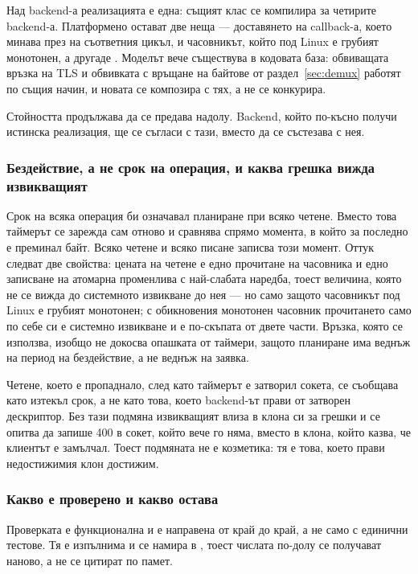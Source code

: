 Над backend-а реализацията е една: същият клас се компилира за четирите backend-а.
Платформено остават две неща — доставянето на callback-а, което минава през  на
съответния цикъл, и часовникът, който под Linux е грубият монотонен, а другаде
. Моделът вече
съществува в кодовата база: обвиващата връзка на TLS и обвивката с връщане на байтове от
раздел~\ref{sec:demux} работят по същия начин, и новата се композира с тях, а не се
конкурира.

Стойността продължава да се предава надолу. Backend, който по-късно получи истинска
реализация, ще се съгласи с тази, вместо да се състезава с нея.

\subsubsection{Бездействие, а не срок на операция, и каква грешка вижда извикващият}

Срок на всяка операция би означавал планиране при всяко четене. Вместо това таймерът се
зарежда сам отново и сравнява спрямо момента, в който за последно е преминал байт. Всяко
четене и всяко писане записва този момент. Оттук следват две свойства: цената на четене е
едно прочитане на часовника и едно записване на атомарна променлива с най-слабата наредба,
тоест величина, която не се вижда до системното извикване до нея — но само защото часовникът
под Linux е грубият монотонен; с обикновения монотонен часовник прочитането само по себе си
е системно извикване и е по-скъпата от двете части. Връзка, която се използва, изобщо не докосва
опашката от таймери, защото планиране има веднъж на период на бездействие, а не веднъж на
заявка.

Четене, което е пропаднало, след като таймерът е затворил сокета, се съобщава като изтекъл
срок, а не като това, което backend-ът прави от затворен дескриптор. Без тази подмяна
извикващият влиза в клона си за грешки и се опитва да запише 400 в сокет, който вече го
няма, вместо в клона, който казва, че клиентът е замълчал. Тоест подмяната не е козметика:
тя е това, което прави недостижимия клон достижим.

\subsubsection{Какво е проверено и какво остава}

Проверката е функционална и е направена от край до край, а не само с единични тестове. Тя е
изпълнима и се намира в , тоест числата
по-долу се получават наново, а не се цитират по памет.

